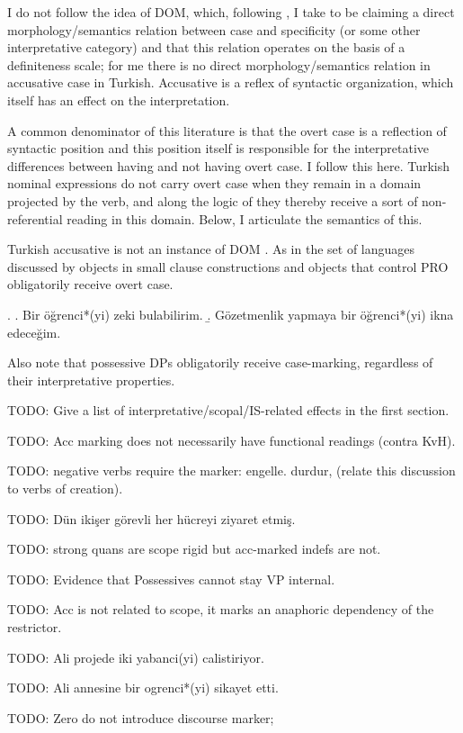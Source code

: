 \documentclass[11pt,a4paper]{article}
\begin{document}
I do not follow the idea of DOM, which, following \cite{lopez12}, I take to be claiming a direct morphology/semantics relation between case and specificity (or some other interpretative category) and that this relation operates on the basis of a definiteness scale; for me there is no direct morphology/semantics relation in accusative case in Turkish. Accusative is a reflex of syntactic organization, which itself has an effect on the interpretation.


 A common denominator of this literature is that the overt case is a reflection of syntactic position and this position itself is responsible for the interpretative differences between having and not having overt case. I follow this here. Turkish nominal expressions do not carry overt case when they remain in a domain projected by the verb, and along the logic of  they thereby receive a sort of non-referential reading in this domain. Below, I articulate the semantics of this.    

Turkish accusative is not an instance of DOM \cite{aissen03}. As in the set of languages discussed by \cite{lopez12} objects in small clause constructions and objects that control PRO obligatorily receive overt case.

\ex.
\a. Bir öğrenci*(yi) zeki bulabilirim.
\b. Gözetmenlik yapmaya bir öğrenci*(yi) ikna edeceğim. 

Also note that possessive DPs obligatorily receive case-marking, regardless of their interpretative properties.

TODO: Give a list of interpretative/scopal/IS-related effects in the first section.

TODO: Acc marking does not necessarily have functional readings (contra KvH).

TODO: negative verbs require the marker: engelle. durdur, (relate this discussion to verbs of creation).

TODO: Dün ikişer görevli her hücreyi ziyaret etmiş.

TODO: strong quans are scope rigid but acc-marked indefs are not.

TODO: Evidence that Possessives cannot stay VP internal.

TODO: Acc is not related to scope, it marks an anaphoric dependency of the restrictor.

TODO: Ali projede iki yabanci(yi) calistiriyor.

TODO: Ali annesine bir ogrenci*(yi) sikayet etti.

TODO: Zero do not introduce discourse marker;
\end{document}
